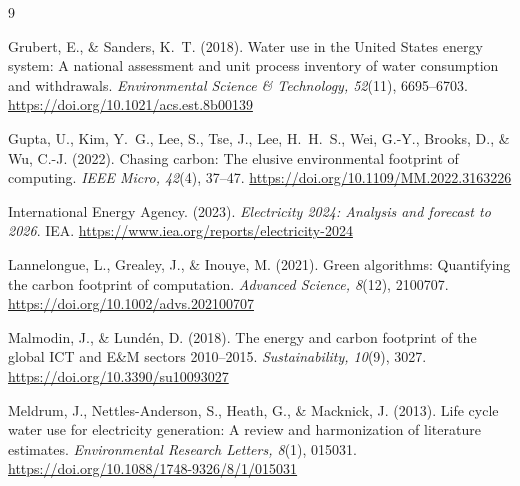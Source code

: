 \documentclass[12pt]{article}
\begin{document}
\begin{thebibliography}{9}

Grubert, E., \& Sanders, K.~T. (2018).
Water use in the United States energy system: A national assessment and unit
process inventory of water consumption and withdrawals.
\textit{Environmental Science \& Technology, 52}(11), 6695--6703.
\url{https://doi.org/10.1021/acs.est.8b00139}

Gupta, U., Kim, Y.~G., Lee, S., Tse, J., Lee, H.~H.~S., Wei, G.-Y.,
Brooks, D., \& Wu, C.-J. (2022).
Chasing carbon: The elusive environmental footprint of computing.
\textit{IEEE Micro, 42}(4), 37--47.
\url{https://doi.org/10.1109/MM.2022.3163226}

International Energy Agency. (2023).
\textit{Electricity 2024: Analysis and forecast to 2026}.
IEA. \url{https://www.iea.org/reports/electricity-2024}

Lannelongue, L., Grealey, J., \& Inouye, M. (2021).
Green algorithms: Quantifying the carbon footprint of computation.
\textit{Advanced Science, 8}(12), 2100707.
\url{https://doi.org/10.1002/advs.202100707}

Malmodin, J., \& Lund\'{e}n, D. (2018).
The energy and carbon footprint of the global ICT and E\&M sectors 2010--2015.
\textit{Sustainability, 10}(9), 3027.
\url{https://doi.org/10.3390/su10093027}

Meldrum, J., Nettles-Anderson, S., Heath, G., \& Macknick, J. (2013).
Life cycle water use for electricity generation: A review and harmonization of
literature estimates.
\textit{Environmental Research Letters, 8}(1), 015031.
\url{https://doi.org/10.1088/1748-9326/8/1/015031}

\end{thebibliography}
\end{document}
